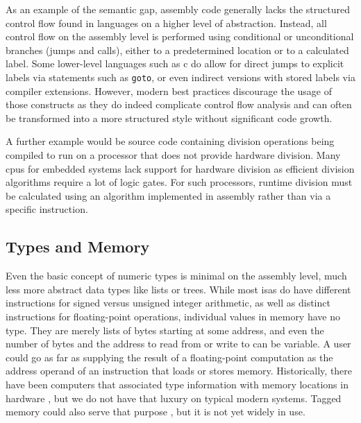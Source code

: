 As an example of the semantic gap, assembly code generally lacks the structured control flow found in languages on a higher level of abstraction.
Instead, all control flow on the assembly level is performed using conditional or unconditional branches (jumps and calls), either to a predetermined location or to a calculated label.
Some lower-level languages such as \gls{c} do allow for direct jumps to explicit labels via statements such as \lstinline|goto|, or even indirect versions with stored labels via compiler extensions.
However, modern best practices discourage the usage of those constructs as they do indeed complicate control flow analysis and can often be transformed into a more structured style without significant code growth.

A further example would be source code containing division operations being compiled to run on a processor that does not provide hardware division.
Many \glspl{cpu} for embedded systems lack support for hardware division as efficient division algorithms require a lot of logic gates.
For such processors, runtime division must be calculated using an algorithm implemented in assembly rather than via a specific instruction.

\subsection{Types and Memory}
Even the basic concept of numeric types is minimal on the assembly level, much less more abstract data types like lists or trees.
While most \glspl{isa} do have different instructions for signed versus unsigned integer arithmetic, as well as distinct instructions for floating-point operations, individual values in memory have no type.
They are merely lists of bytes starting at some address, and even the number of bytes and the address to read from or write to can be variable.
A user could go as far as supplying the result of a floating-point computation as the address operand of an instruction that loads or stores memory.
Historically, there have been computers that associated type information with memory locations in hardware \autocite{feustel1972rice,feustel1973advantages,thornton2008rice}, but we do not have that luxury on typical modern systems.
Tagged memory could also serve that purpose \autocite{bradbury2014tagged,song2015towards,zeldovich2008tagged}, but it is not yet widely in use.

